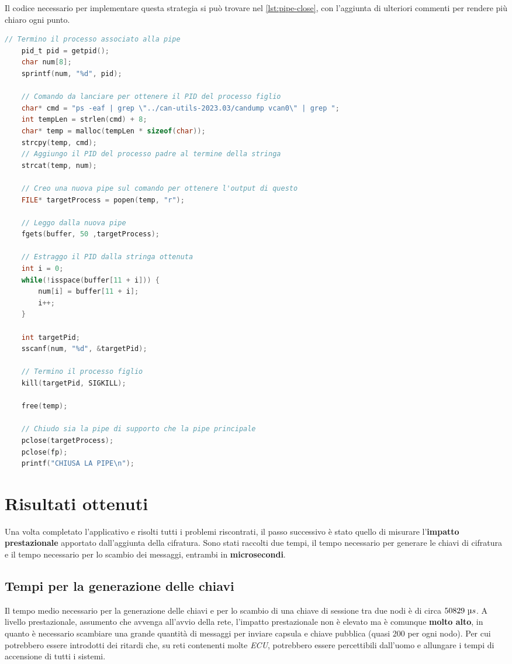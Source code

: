 Il codice necessario per implementare questa strategia si può trovare nel \autoref{lst:pipe-close}, con l'aggiunta di ulteriori commenti per rendere più chiaro ogni punto.

\begin{lstlisting}[language=c, caption=Operazioni necessarie per chiudere la \emph{pipe}, label=lst:pipe-close]
    // Termino il processo associato alla pipe
    pid_t pid = getpid();
    char num[8];
    sprintf(num, "%d", pid);

    // Comando da lanciare per ottenere il PID del processo figlio
    char* cmd = "ps -eaf | grep \"../can-utils-2023.03/candump vcan0\" | grep ";
    int tempLen = strlen(cmd) + 8;
    char* temp = malloc(tempLen * sizeof(char));
    strcpy(temp, cmd);
    // Aggiungo il PID del processo padre al termine della stringa
    strcat(temp, num);
    
    // Creo una nuova pipe sul comando per ottenere l'output di questo
    FILE* targetProcess = popen(temp, "r");

    // Leggo dalla nuova pipe
    fgets(buffer, 50 ,targetProcess);

    // Estraggo il PID dalla stringa ottenuta
    int i = 0;
    while(!isspace(buffer[11 + i])) {
        num[i] = buffer[11 + i];
        i++;
    }

    int targetPid;
    sscanf(num, "%d", &targetPid);

    // Termino il processo figlio
    kill(targetPid, SIGKILL);

    free(temp);

    // Chiudo sia la pipe di supporto che la pipe principale
    pclose(targetProcess);
    pclose(fp);
    printf("CHIUSA LA PIPE\n");
\end{lstlisting}

\section{Risultati ottenuti}
Una volta completato l'applicativo e risolti tutti i problemi riscontrati, il passo successivo è stato quello di misurare l'\textbf{impatto prestazionale} apportato dall'aggiunta della cifratura. Sono stati raccolti due tempi, il tempo necessario per generare le chiavi di cifratura e il tempo necessario per lo scambio dei messaggi, entrambi in \textbf{microsecondi}.

\subsection{Tempi per la generazione delle chiavi}
Il tempo medio necessario per la generazione delle chiavi e per lo scambio di una chiave di sessione tra due nodi è di circa $50829\ \micro s$. A livello prestazionale, assumento che avvenga all'avvio della rete, l'impatto prestazionale non è elevato ma è comunque \textbf{molto alto}, in quanto è necessario scambiare una grande quantità di messaggi per inviare capsula e chiave pubblica (quasi 200 per ogni nodo). Per cui potrebbero essere introdotti dei ritardi che, su reti contenenti molte \emph{ECU}, potrebbero essere percettibili dall'uomo e allungare i tempi di accensione di tutti i sistemi.

